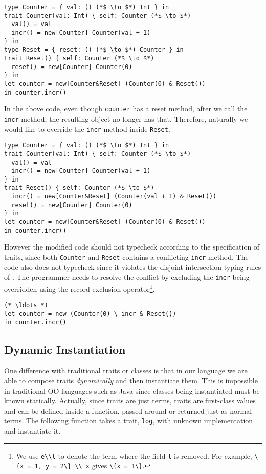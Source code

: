 \begin{lstlisting}
type Counter = { val: () (*$ \to $*) Int } in
trait Counter(val: Int) { self: Counter (*$ \to $*)
  val() = val
  incr() = new[Counter] Counter(val + 1)
} in
type Reset = { reset: () (*$ \to $*) Counter } in
trait Reset() { self: Counter (*$ \to $*)
  reset() = new[Counter] Counter(0)
} in
let counter = new[Counter&Reset] (Counter(0) & Reset())
in counter.incr()
\end{lstlisting}

In the above code, even though \lstinline$counter$ has a reset method, after we
call the \lstinline$incr$ method, the resulting object no longer has that.
Therefore, naturally we would like to override the \lstinline$incr$ method
inside \lstinline$Reset$.

\begin{lstlisting}
type Counter = { val: () (*$ \to $*) Int } in
trait Counter(val: Int) { self: Counter (*$ \to $*)
  val() = val
  incr() = new[Counter] Counter(val + 1)
} in
trait Reset() { self: Counter (*$ \to $*)
  incr() = new[Counter&Reset] (Counter(val + 1) & Reset())
  reset() = new[Counter] Counter(0)
} in
let counter = new[Counter&Reset] (Counter(0) & Reset())
in counter.incr()
\end{lstlisting}

However the modified code should not typecheck according to the specification of
traits, since both \lstinline$Counter$ and \lstinline$Reset$ contains a
conflicting \lstinline$incr$ method. The code also does not typecheck since it
violates the disjoint intersection typing rules of \name. The programmer needs
to resolve the conflict by excluding the \lstinline$incr$ being overridden using
the record exclusion operator\footnote{We use \lstinline$e\\l$ to denote the
term where the field \lstinline$l$ is removed. For example, \lstinline$\{x = 1,
y = 2\} \\ x$ gives \lstinline$\{x = 1\}$.}.

\begin{lstlisting}
(* \ldots *)
let counter = new (Counter(0) \ incr & Reset())
in counter.incr()
\end{lstlisting}

\subsection{Dynamic Instantiation}

One difference with traditional traits or classes is that in our
language we are able to compose traits \emph{dynamically} and then instantiate
them. This is impossible in traditional OO languages such as Java since classes
being instantiated must be known statically. Actually, since traits are just
terms, traits are first-class values and can be defined inside a function,
passed around or returned just as normal terms. The following function takes a
trait, \lstinline$log$, with unknown implementation and instantiate it.

